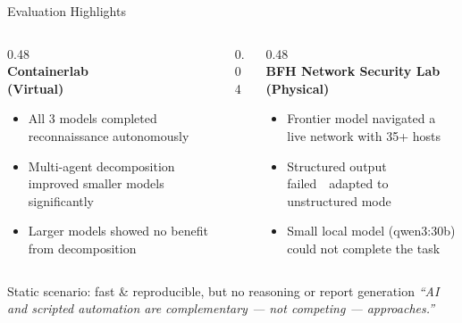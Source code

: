 
\begin{frame}{Evaluation Highlights}
  \begin{columns}[T]
    \begin{column}{0.48\textwidth}
      \centering
      {\Large\faNetworkWired}\\[0.3em]
      \textbf{Containerlab}\\
      \textbf{(Virtual)}
      \vspace{0.4em}
      \begin{itemize}
        \setlength\itemsep{0.4em}
        \item[\textcolor{green!60!black}{\faCheck}] All 3 models completed reconnaissance autonomously
        \item[\textcolor{green!60!black}{\faCheck}] Multi-agent decomposition improved smaller models significantly
        \item[\textcolor{orange!80!black}{\faMinus}] Larger models showed no benefit from decomposition
      \end{itemize}
    \end{column}
    \begin{column}{0.04\textwidth}\end{column}
    \begin{column}{0.48\textwidth}
      \centering
      {\Large\faBuilding}\\[0.3em]
      \textbf{BFH Network Security Lab}\\
      \textbf{(Physical)}
      \vspace{0.4em}
      \begin{itemize}
        \setlength\itemsep{0.4em}
        \item[\textcolor{green!60!black}{\faCheck}] Frontier model navigated a live network with 35+ hosts
        \item[\textcolor{orange!80!black}{\faMinus}] Structured output failed~\textthreequartersemdash~adapted to unstructured mode
        \item[\textcolor{orange!80!black}{\faMinus}] Small local model (qwen3:30b) could not complete the task
      \end{itemize}
    \end{column}
  \end{columns}
  \vspace{0.9em}
  \begin{center}
    {\small Static scenario: fast \& reproducible, but no reasoning or report generation}
    \textit{``AI and scripted automation are complementary — not competing — approaches.''}
  \end{center}
\end{frame}
